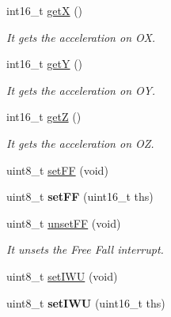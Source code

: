 \begin{DoxyCompactItemize}
int16\+\_\+t \hyperlink{class_wasp_a_c_c_ae65dc36d04d671625b0d4b58955acf3b}{getX} ()
\begin{DoxyCompactList}\small\item\em It gets the acceleration on OX. \end{DoxyCompactList}\item 
int16\+\_\+t \hyperlink{class_wasp_a_c_c_ae6d575b655e4ddb8a7de018968247268}{getY} ()
\begin{DoxyCompactList}\small\item\em It gets the acceleration on OY. \end{DoxyCompactList}\item 
int16\+\_\+t \hyperlink{class_wasp_a_c_c_a631199092bf550be18b8cd95ed741291}{getZ} ()
\begin{DoxyCompactList}\small\item\em It gets the acceleration on OZ. \end{DoxyCompactList}\item 
uint8\+\_\+t \hyperlink{class_wasp_a_c_c_a1dbfc0236297b3466a1181b393304da6}{set\+FF} (void)
\item 
uint8\+\_\+t {\bfseries set\+FF} (uint16\+\_\+t ths)\hypertarget{class_wasp_a_c_c_a7585a89ccd3e88854a04234a618ea917}{}\label{class_wasp_a_c_c_a7585a89ccd3e88854a04234a618ea917}

\item 
uint8\+\_\+t \hyperlink{class_wasp_a_c_c_a206628c3b6747bd713c379b303cd1feb}{unset\+FF} (void)
\begin{DoxyCompactList}\small\item\em It unsets the Free Fall interrupt. \end{DoxyCompactList}\item 
uint8\+\_\+t \hyperlink{class_wasp_a_c_c_addb9450894c12ed72ff766a6aabb4ed5}{set\+I\+WU} (void)
\item 
uint8\+\_\+t {\bfseries set\+I\+WU} (uint16\+\_\+t ths)\hypertarget{class_wasp_a_c_c_ab03be8f6e276d552c84e4f3c5602ba2b}{}\label{class_wasp_a_c_c_ab03be8f6e276d552c84e4f3c5602ba2b}


\end{DoxyCompactItemize}
